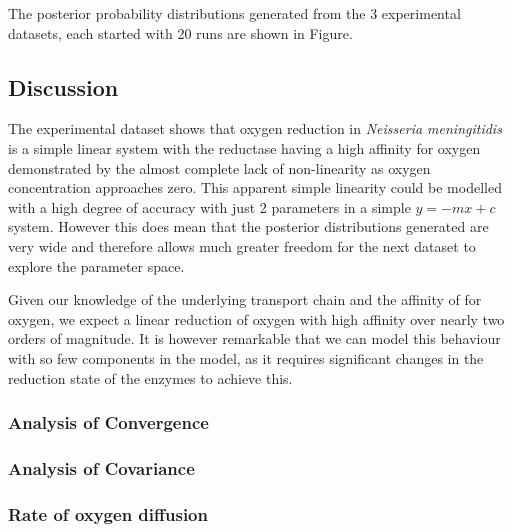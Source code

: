 The posterior probability distributions generated from the 3 experimental datasets, each started with 20 runs are shown in Figure.

\subsection{Discussion}
The experimental dataset shows that oxygen reduction in \textit{Neisseria meningitidis} is a simple linear system with the reductase having a high affinity for oxygen demonstrated by the almost complete lack of non-linearity as oxygen concentration approaches zero. This apparent simple linearity could be modelled with a high degree of accuracy with just 2 parameters in a simple $y=-mx+c$ system. However this does mean that the posterior distributions generated are very wide and therefore allows much greater freedom for the next dataset to explore the parameter space.

Given our knowledge of the underlying transport chain and the affinity of \cbbthree{} for oxygen, we expect a linear reduction of oxygen with high affinity over nearly two orders of magnitude. It is however remarkable that we can model this behaviour with so few components in the model, as it requires significant changes in the reduction state of the enzymes to achieve this.

\subsubsection{Analysis of Convergence}
\subsubsection{Analysis of Covariance}

\subsubsection{Rate of oxygen diffusion}